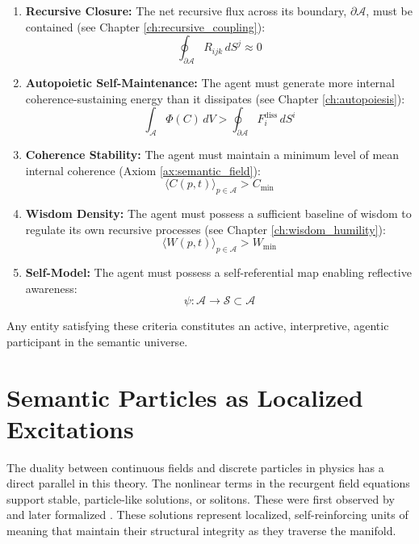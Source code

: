 \begin{enumerate}
    \item \textbf{Recursive Closure:} The net recursive flux across its boundary, \(\partial \mathcal{A}\), must be contained (see Chapter \ref{ch:recursive_coupling}):
    \begin{equation}
        \oint_{\partial \mathcal{A}} R_{ijk} \, dS^j \approx 0
    \end{equation}
    \item \textbf{Autopoietic Self-Maintenance:} The agent must generate more internal coherence-sustaining energy than it dissipates (see Chapter \ref{ch:autopoiesis}):
    \begin{equation}
        \int_{\mathcal{A}} \Phi(C) \, dV > \oint_{\partial \mathcal{A}} F_i^{\text{diss}} \, dS^i
    \end{equation}
    \item \textbf{Coherence Stability:} The agent must maintain a minimum level of mean internal coherence (Axiom \ref{ax:semantic_field}):
    \begin{equation}
        \langle C(p,t) \rangle_{p \in \mathcal{A}} > C_{\text{min}}
    \end{equation}
    \item \textbf{Wisdom Density:} The agent must possess a sufficient baseline of wisdom to regulate its own recursive processes (see Chapter \ref{ch:wisdom_humility}):
    \begin{equation}
        \langle W(p,t) \rangle_{p \in \mathcal{A}} > W_{\text{min}}
    \end{equation}
    \item \textbf{Self-Model:} The agent must possess a self-referential map enabling reflective awareness:
    \begin{equation}
        \psi: \mathcal{A} \to \mathcal{S} \subset \mathcal{A}
    \end{equation}
\end{enumerate}

Any entity satisfying these criteria constitutes an active, interpretive, agentic participant in the semantic universe.

\section{Semantic Particles as Localized Excitations}

The duality between continuous fields and discrete particles in physics has a direct parallel in this theory. The nonlinear terms in the recurgent field equations support stable, particle-like solutions, or solitons. These were first observed by \autocite{Russell1845} and later formalized \autocite{KortewegdeVries1895, ZabuskyKruskal1965}. These solutions represent localized, self-reinforcing units of meaning that maintain their structural integrity as they traverse the manifold.

